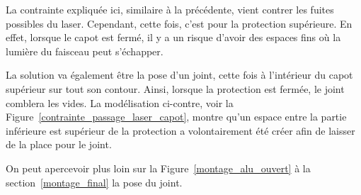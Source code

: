 \begin{minipage}[c]{0.6\textwidth}
    La contrainte expliquée ici, similaire à la précédente, vient contrer les fuites possibles du laser. Cependant, cette fois, c'est pour la protection supérieure. En effet, lorsque le capot est fermé, il y a un risque d'avoir des espaces fins où la lumière du faisceau peut s'échapper.

    La solution va également être la pose d'un joint, cette fois à l'intérieur du capot supérieur sur tout son contour. Ainsi, lorsque la protection est fermée, le joint comblera les vides. La modélisation ci-contre, voir la Figure~\ref{contrainte_passage_laser_capot}, montre qu'un espace entre la partie inférieure est supérieur de la protection a volontairement été créer afin de laisser de la place pour le joint.

    On peut apercevoir plus loin sur la Figure~\ref{montage_alu_ouvert} à la section~\ref{montage_final} la pose du joint.
\end{minipage}\hfill
